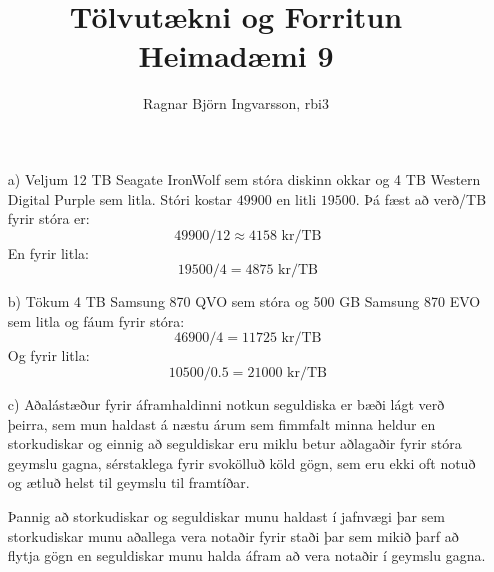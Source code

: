 \documentclass{article}
\title{Tölvutækni og Forritun Heimadæmi 9 }
\author{Ragnar Björn Ingvarsson, rbi3}
\begin{document}
\renewcommand\thepage{}

	\maketitle

	\newpage
	\setcounter{page}{1}
	\renewcommand\thepage{\arabic{page}}

	\section{}
	\begin{itemize}
		\item[a)] Veljum 12 TB Seagate IronWolf sem stóra diskinn okkar og 
			4 TB Western Digital Purple sem litla. Stóri kostar $49900$ en 
			litli $19500$. Þá fæst að verð/TB fyrir stóra er:
			\begin{equation}
				49900/12 \approx 4158\text{ kr/TB}
				\label{eq:gamer}
			\end{equation}
			En fyrir litla:
			\begin{equation}
				19500/4 = 4875\text{ kr/TB}
				\label{eq:gamer1}
			\end{equation}
		\item[b)] Tökum 4 TB Samsung 870 QVO sem stóra og 500 GB Samsung 
			870 EVO sem litla og fáum fyrir stóra:
			\begin{equation}
				46900/4 = 11725\text{ kr/TB}
				\label{eq:gamer2}
			\end{equation}
			Og fyrir litla:
			\begin{equation}
				10500/0.5 = 21000\text{ kr/TB}
				\label{eq:gamer3}
			\end{equation}
		\item[c)] Aðalástæður fyrir áframhaldinni notkun seguldiska er bæði 
			lágt verð þeirra, sem mun haldast á næstu árum sem fimmfalt 
			minna heldur en storkudiskar og einnig að seguldiskar eru 
			miklu betur aðlagaðir fyrir stóra geymslu gagna, sérstaklega 
			fyrir svokölluð köld gögn, sem eru ekki oft notuð og ætluð 
			helst til geymslu til framtíðar.

			Þannig að storkudiskar og seguldiskar munu haldast í jafnvægi 
			þar sem storkudiskar munu aðallega vera notaðir fyrir staði þar 
			sem mikið þarf að flytja gögn en seguldiskar munu halda áfram 
			að vera notaðir í geymslu gagna.
	\end{itemize}
\end{document}
